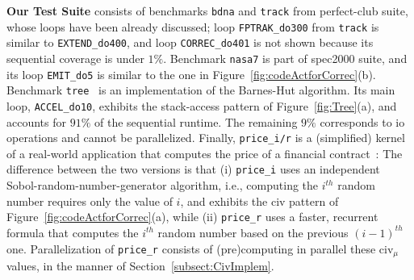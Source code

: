 \documentclass{sig-alternate}
\begin{document}
\vspace{1ex}

{\bf Our Test Suite} consists of benchmarks {\tt bdna} and {\tt track} 
from {\sc perfect-club} suite, whose loops have been already discussed;
loop {\tt FPTRAK\_do300} from {\tt track} is similar to {\tt EXTEND\_do400},
and loop {\tt CORREC\_do401} is not shown because 
its sequential coverage is under $1\%$. 
%
Benchmark {\tt nasa7} is part of {\sc spec2000} suite, and its loop {\tt EMIT\_do5}
is similar to the one in Figure~\ref{fig:codeActforCorrec}(b).
%
Benchmark {\tt tree}~\cite{Treecode} is an implementation of the Barnes-Hut algorithm.
Its main loop, {\tt ACCEL\_do10}, exhibits the stack-access pattern of Figure~\ref{fig:Tree}(a),
and accounts for $91\%$ of the sequential runtime. The remaining $9\%$ corresponds to {\sc io}
operations and cannot be parallelized.
%
Finally,  {\tt price\_i/r} is a (simplified) kernel of a real-world application that
computes the price of a financial contract~\cite{LexiFiPricing}:   The difference
between the two versions is that (i) {\tt price\_i} uses an independent Sobol-random-number-generator
algorithm, i.e., computing the $i^{th}$ random number requires only the value of $i$,
and exhibits the {\sc civ} pattern of Figure~\ref{fig:codeActforCorrec}(a), 
while (ii) {\tt price\_r} uses a faster, recurrent formula that computes the 
$i^{th}$ random number based on the previous $(i-1)^{th}$ one. 
Parallelization of {\tt price\_r} consists of (pre)computing
in parallel these {\sc civ}$_\mu$ values, in the manner of 
Section~\ref{subsect:CivImplem}.  

\end{document}
